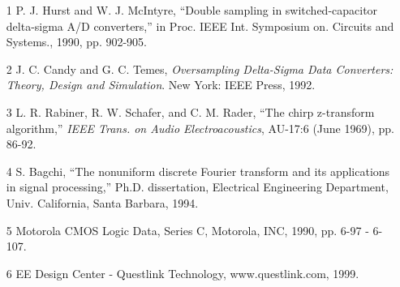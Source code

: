 \documentclass[12pt]{article}
\begin{document}
\begin{enumerate}[noitemsep]
    \item [1] P. J. Hurst and W. J. McIntyre, “Double sampling in switched-capacitor delta-sigma A/D converters,” in Proc. IEEE Int. Symposium on. Circuits and Systems., 1990, pp. 902-905.
    \item [2] J. C. Candy and G. C. Temes, \textit{Oversampling Delta-Sigma Data Converters: Theory, Design and Simulation}. New York: IEEE Press, 1992.
    \item [3] L. R. Rabiner, R. W. Schafer, and C. M. Rader, “The chirp z-transform algorithm,” \textit{IEEE Trans. on Audio Electroacoustics}, AU-17:6 (June 1969), pp. 86-92.
    \item [4] S. Bagchi, “The nonuniform discrete Fourier transform and its applications in signal processing,” Ph.D. dissertation, Electrical Engineering Department, Univ. California, Santa Barbara, 1994.
    \item [5] Motorola CMOS Logic Data, Series C, Motorola, INC, 1990, pp. 6-97 - 6-107.
    \item [6] EE Design Center - Questlink Technology, www.questlink.com, 1999.
\end{enumerate}

\end{document}
